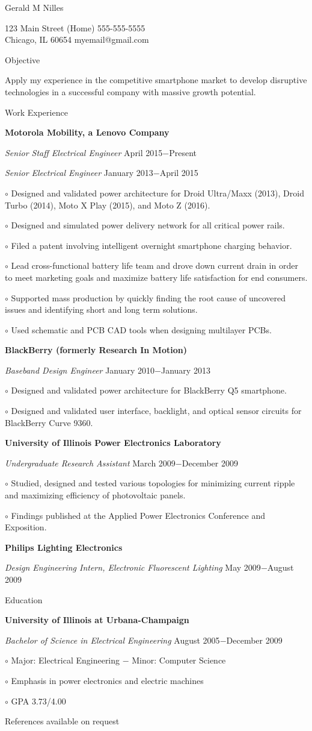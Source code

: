 \documentclass[12pt, letterpaper]{article}
\newcommand{\myname}[1]{{\begin{center} \LARGE #1 \end{center} \par }}
\newcommand{\myhead}[1]{{\vspace{2mm} \Large #1 \par}}
\newcommand{\objective}[1]{{\addtolength{\leftskip}{10mm} #1 \par }}
\newcommand{\company}[1]{{\vspace{1mm} \addtolength{\leftskip}{10mm} \textbf{#1} \par}}
\newcommand{\position}[2]{{\addtolength{\leftskip}{10mm} \emph{#1} \hfill #2 \par \vspace{1mm}}}
\newcommand{\skill}[1]{{  \vspace{0.3mm} \addtolength{\leftskip}{20mm} \setlength\parindent{-4mm} $\circ$ #1 \par}}
\begin{document}
\pagestyle{empty}
\raggedright

\myname{Gerald M Nilles}
123 Main Street \hfill (Home) 555-555-5555 \\
Chicago, IL 60654   \hfill myemail@gmail.com \\
\myhead{Objective}
    \objective{Apply my experience in the competitive smartphone market to develop disruptive technologies in a successful company with massive growth potential.}

\myhead{Work Experience}
    \company{Motorola Mobility, a Lenovo Company}
    \position{Senior Staff Electrical Engineer}{April 2015$-$Present}
    \position{Senior Electrical Engineer}{January 2013$-$April 2015}
        \skill{Designed and validated power architecture for Droid Ultra/Maxx (2013), Droid Turbo (2014), Moto X Play (2015), and Moto Z (2016).}
        \skill{Designed and simulated power delivery network for all critical power rails.}
	\skill{Filed a patent involving intelligent overnight smartphone charging behavior.}
        \skill{Lead cross-functional battery life team and drove down current drain in order to meet marketing goals and maximize battery life satisfaction for end consumers.}
	\skill{Supported mass production by quickly finding the root cause of uncovered issues and identifying short and long term solutions.}
        \skill{Used schematic and PCB CAD tools when designing multilayer PCBs.}

    \company{BlackBerry (formerly Research In Motion)}
    \position{Baseband Design Engineer}{January 2010$-$January 2013}
        \skill{Designed and validated power architecture for BlackBerry Q5 smartphone.}
        \skill{Designed and validated user interface, backlight, and optical sensor circuits for BlackBerry Curve 9360.}

    \company{University of Illinois Power Electronics Laboratory}
    \position{Undergraduate Research Assistant}{March 2009$-$December 2009}
        \skill{Studied, designed and tested various topologies for minimizing current ripple and maximizing efficiency of photovoltaic panels.}
	\skill{Findings published at the Applied Power Electronics Conference and Exposition.}

    \company{Philips Lighting Electronics} 
    \position{Design Engineering Intern, Electronic Fluorescent Lighting}{May 2009$-$August 2009}

\myhead{Education}
    \company{University of Illinois at Urbana-Champaign}
    \position{Bachelor of Science in Electrical Engineering}{August 2005$-$December 2009}
        \skill{Major: Electrical Engineering $-$ Minor: Computer Science}
        \skill{Emphasis in power electronics and electric machines}
	\skill{GPA 3.73/4.00}

\begin{center}
\small
References available on request
\end{center}
\end{document}
